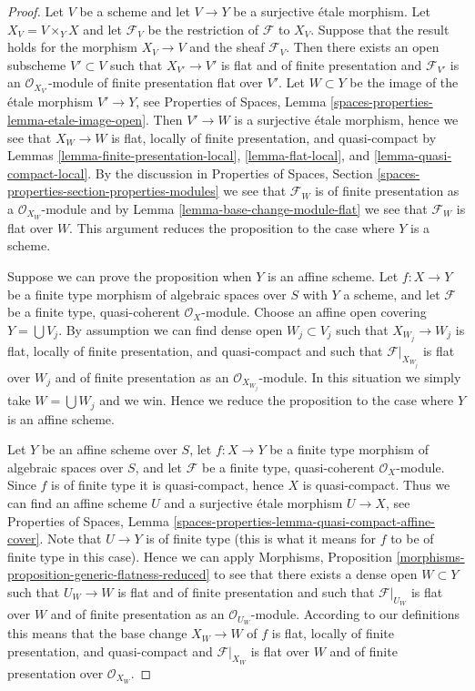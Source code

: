 \begin{proof}
Let $V$ be a scheme and let $V \to Y$ be a surjective \'etale morphism.
Let $X_V = V \times_Y X$ and let $\mathcal{F}_V$ be the restriction of
$\mathcal{F}$ to $X_V$. Suppose that the result holds for the morphism
$X_V \to V$ and the sheaf $\mathcal{F}_V$. Then there exists an open subscheme
$V' \subset V$ such that $X_{V'} \to V'$ is flat and of finite presentation
and $\mathcal{F}_{V'}$ is an $\mathcal{O}_{X_{V'}}$-module of finite
presentation flat over $V'$. Let $W \subset Y$ be the image of
the \'etale morphism $V' \to Y$, see
Properties of Spaces, Lemma \ref{spaces-properties-lemma-etale-image-open}.
Then $V' \to W$ is a surjective \'etale morphism, hence we see that
$X_W \to W$ is flat, locally of finite presentation, and quasi-compact by
Lemmas \ref{lemma-finite-presentation-local},
\ref{lemma-flat-local}, and
\ref{lemma-quasi-compact-local}.
By the discussion in
Properties of Spaces, Section
\ref{spaces-properties-section-properties-modules}
we see that $\mathcal{F}_W$ is of finite presentation as a
$\mathcal{O}_{X_W}$-module and by
Lemma \ref{lemma-base-change-module-flat}
we see that $\mathcal{F}_W$ is flat over $W$. This argument
reduces the proposition to the case where $Y$ is a scheme.

\medskip\noindent
Suppose we can prove the proposition when $Y$ is an affine scheme.
Let $f : X \to Y$ be a finite type morphism of algebraic spaces
over $S$ with $Y$ a scheme, and let $\mathcal{F}$ be a finite type,
quasi-coherent $\mathcal{O}_X$-module. Choose an affine open covering
$Y = \bigcup V_j$. By assumption we can find dense open $W_j \subset V_j$
such that $X_{W_j} \to W_j$ is flat, locally of finite presentation, and
quasi-compact and such that $\mathcal{F}|_{X_{W_j}}$ is flat over $W_j$
and of finite presentation as an $\mathcal{O}_{X_{W_j}}$-module. In this
situation we simply take $W = \bigcup W_j$ and we win. Hence we reduce
the proposition to the case where $Y$ is an affine scheme.

\medskip\noindent
Let $Y$ be an affine scheme over $S$, let
$f : X \to Y$ be a finite type morphism of algebraic spaces
over $S$, and let $\mathcal{F}$ be a finite type,
quasi-coherent $\mathcal{O}_X$-module. Since $f$ is of finite type
it is quasi-compact, hence $X$ is quasi-compact. Thus we can find
an affine scheme $U$ and a surjective \'etale morphism $U \to X$, see
Properties of Spaces, Lemma
\ref{spaces-properties-lemma-quasi-compact-affine-cover}.
Note that $U \to Y$ is of finite type (this is what it means for
$f$ to be of finite type in this case). Hence we can apply
Morphisms, Proposition \ref{morphisms-proposition-generic-flatness-reduced}
to see that there exists a dense open $W \subset Y$ such that
$U_W \to W$ is flat and of finite presentation and such that
$\mathcal{F}|_{U_W}$ is flat over $W$ and of finite presentation
as an $\mathcal{O}_{U_W}$-module. According to our definitions this means that
the base change $X_W \to W$ of $f$ is flat, locally of finite presentation,
and quasi-compact and $\mathcal{F}|_{X_W}$ is flat over $W$ and of
finite presentation over $\mathcal{O}_{X_W}$.
\end{proof}

